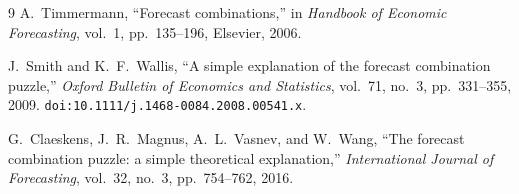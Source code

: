 \documentclass[11pt]{article}
\begin{document}
\begin{thebibliography}{9}
  A.~Timmermann,
  ``Forecast combinations,''
  in \emph{Handbook of Economic Forecasting}, vol.~1, pp.~135--196,
  Elsevier, 2006.

  J.~Smith and K.~F.~Wallis,
  ``A simple explanation of the forecast combination puzzle,''
  \emph{Oxford Bulletin of Economics and Statistics}, vol.~71, no.~3,
  pp.~331--355, 2009. \texttt{doi:10.1111/j.1468-0084.2008.00541.x}.

  G.~Claeskens, J.~R.~Magnus, A.~L.~Vasnev, and W.~Wang,
  ``The forecast combination puzzle: a simple theoretical explanation,''
  \emph{International Journal of Forecasting}, vol.~32, no.~3, pp.~754--762, 2016.
\end{thebibliography}
\end{document}
